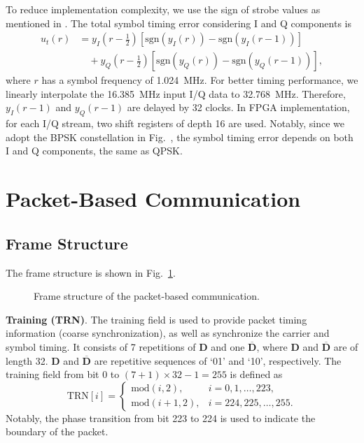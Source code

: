 \documentclass[journal,twoside]{IEEEtran}
\begin{document}
      To reduce implementation complexity, we use the sign of strobe values as mentioned in \cite{gardner1986bpsk}.
      The total symbol timing error considering I and Q components is
      \begin{equation}
        \begin{aligned}
          u_t(r)&=y_I(r-\tfrac12)\left[\mathrm{sgn}\left(y_I(r)\right)-\mathrm{sgn}\left(y_I(r-1)\right)\right] \\
          &\quad{}+y_Q(r-\tfrac12)\left[\mathrm{sgn}\left(y_Q(r)\right)-\mathrm{sgn}\left(y_Q(r-1)\right)\right],
        \end{aligned}
      \end{equation}
      where $r$ has a symbol frequency of \qty{1.024}{MHz}.
      For better timing performance, we linearly interpolate the \qty{16.385}{MHz} input I/Q data to \qty{32.768}{MHz}.
      Therefore, $y_I(r-1)$ and $y_Q(r-1)$ are delayed by 32 clocks.
      In FPGA implementation, for each I/Q stream, two shift registers of depth 16 are used.
      Notably, since we adopt the BPSK constellation in Fig.~,
      the symbol timing error depends on both I and Q components, the same as QPSK.

  \section{Packet-Based Communication}

    \subsection{Frame Structure}\label{subsec:frame_structure}

      The frame structure is shown in Fig.~\ref{fig:frame_structure}.
      \begin{figure}[htbp]
        \centering
        
        \caption{Frame structure of the packet-based communication.}
        \label{fig:frame_structure}
      \end{figure}

    \textbf{Training (TRN)}.
    The training field is used to provide packet timing information (coarse synchronization),
    as well as synchronize the carrier and symbol timing.
    It consists of 7 repetitions of $\mathbf{D}$ and one $\overline{\mathbf{D}}$,
    where $\mathbf{D}$ and $\overline{\mathbf{D}}$ are of length 32.
    $\mathbf{D}$ and $\overline{\mathbf{D}}$ are repetitive sequences of `01' and `10', respectively.
    The training field from bit $0$ to $(7+1)\times32-1=255$ is defined as
    \begin{equation}
      \mathrm{TRN}[i]=\begin{cases}
        \mathrm{mod}(i,2), & i=0,1,\dots,223,\\
        \mathrm{mod}(i+1,2), & i=224,225,\dots,255.
      \end{cases}
    \end{equation}
    Notably, the phase transition from bit 223 to 224 is used to indicate the boundary of the packet.
\end{document}
